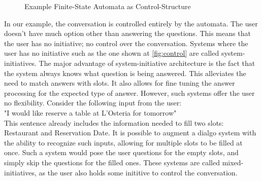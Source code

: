 \usetikzlibrary{automata,positioning}
\begin{figure}[htbp]
  \centering
  \caption[Example Finite-State Automata as Control-Structure]{Example Finite-State Automata as Control-Structure}\label{fig:control}
\end{figure}

In our example, the conversation is controlled entirely by the automata.
The user doesn't have much option other than answering the questions.
This means that the user has no initiative; no control over the conversation.
Systems where the user has no initiative such as the one shown at \autoref{fig:control} are called system-initiatives.
The major advantage of system-initiative architecture is the fact that the system always knows what question is being answered.
This alleviates the need to match answers with slots.
It also allows for fine tuning the answer processing for the expected type of answer.
However, such systems offer the user no flexibility.
Consider the following input from the user:\\
"I would like reserve a table at L'Osteria for tomorrow"\\
This sentence already includes the information needed to fill two slots: Restaurant and Reservation Date.
It is possible to augment a dialgo system with the ability to recognize such inputs, allowing for multiple slots to be filled at once.
Such a system would pose the user questions for the empty slots, and simply skip the questions for the filled ones.
These systems are called mixed-initiatives, as the user also holds some inititive to control the conversation.

